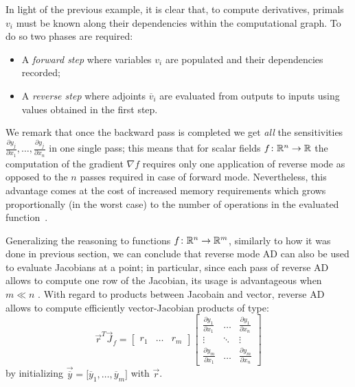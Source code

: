 \medskip
In light of the previous example, it is clear that, to compute derivatives, primals $v_i$ must be known along their dependencies within the computational graph. To do so two phases are required:
\begin{itemize}
	\item A \emph{forward step} where variables $v_i$ are populated and their dependencies recorded;
	\item A \emph{reverse step} where adjoints $\overline{v}_i$ are evaluated from outputs to inputs using values obtained in the first step.
\end{itemize}
We remark that once the backward pass is completed we get \emph{all} the sensitivities $\frac{\partial y_j}{\partial x_1}, \dots, \frac{\partial y_j}{\partial x_n}$ in one single pass; this means that for scalar fields $f \colon \mathbb{R}^n \to \mathbb{R}$ the computation of the gradient $\nabla f$ requires only one application of reverse mode as opposed to the $n$ passes required in case of forward mode. Nevertheless, this advantage comes at the cost of increased memory requirements which grows proportionally (in the worst case) to the number of operations in the evaluated function~\cite{Baydin:AD_survey}.

Generalizing the reasoning to functions $f \colon \mathbb{R}^n \to \mathbb{R}^m$, similarly to how it was done in previous section, we can conclude that reverse mode AD can also be used to evaluate Jacobians at a point; in particular, since each pass of reverse AD allows to compute one row of the Jacobian, its usage is advantageous when $m \ll n$ .
With regard to products between Jacobain and vector, reverse AD allows to compute efficiently vector-Jacobian products of type:
\begin{equation}
	\vec{r}^T \vec{J}_f =
	\begin{bmatrix}
		r_1 	& \dots  & r_m
	\end{bmatrix}
	\begin{bmatrix}
		\frac{\partial y_1}{\partial x_1} &  \dots  & \frac{\partial y_1}{\partial x_n}  \\
		\vdots							  & \ddots  & \vdots							 \\
		\frac{\partial y_m}{\partial x_1} &  \dots  & \frac{\partial y_m}{\partial x_n}
	\end{bmatrix}
\end{equation}
by initializing $\vec{\overline{y}}=\big[\overline{y}_1, \dots, \overline{y}_m \big]$ with $\vec{r}$.



